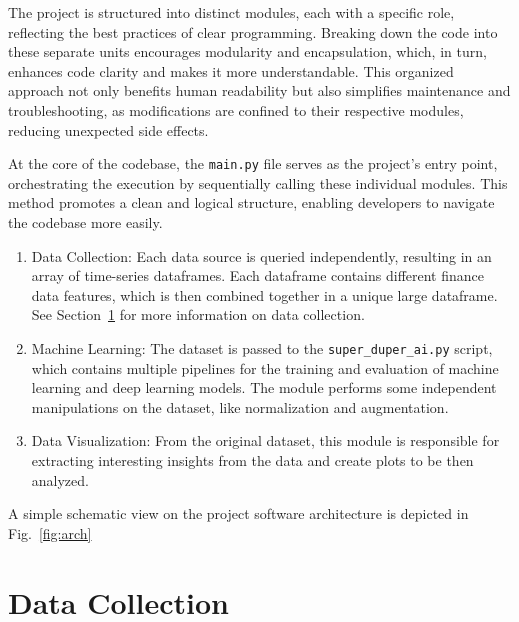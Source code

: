\documentclass[10pt]{article} %
\begin{document}
The project is structured into distinct modules, each with a specific role, reflecting the best practices of clear programming. Breaking down the code into these separate units encourages modularity and encapsulation, which, in turn, enhances code clarity and makes it more understandable. This organized approach not only benefits human readability but also simplifies maintenance and troubleshooting, as modifications are confined to their respective modules, reducing unexpected side effects.

At the core of the codebase, the \texttt{main.py} file serves as the project's entry point, orchestrating the execution by sequentially calling these individual modules. This method promotes a clean and logical structure, enabling developers to navigate the codebase more easily.

\begin{enumerate}
  \item Data Collection: Each data source is queried independently, resulting in an array of time-series dataframes. Each dataframe contains different finance data features, which is then combined together in a unique large dataframe. See Section~\ref{sec:data} for more information on data collection.
  \item Machine Learning: The dataset is passed to the \texttt{super\_duper\_ai.py} script, which contains multiple pipelines for the training and evaluation of machine learning and deep learning models. The module performs some independent manipulations on the dataset, like normalization and augmentation.
  \item Data Visualization: From the original dataset, this module is responsible for extracting interesting insights from the data and create plots to be then analyzed.
\end{enumerate}

A simple schematic view on the project software architecture is depicted in Fig.~\ref{fig:arch}

\section{Data Collection}\label{sec:data}
\end{document}
